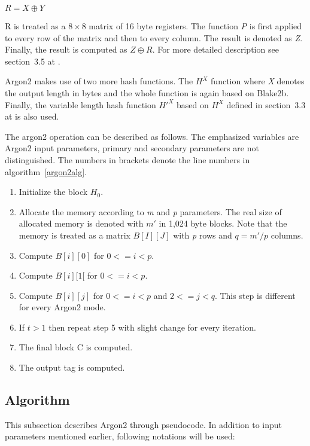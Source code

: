 \documentclass[nolof,digital]{fithesis3}
\begin{document}
\(R = X \oplus Y \)

R is treated as a \(8 \times 8 \) matrix of 16 byte registers. The function \emph{P} is first applied to every row of the matrix and then to every column. The result is denoted as \emph{Z}. Finally, the result is computed as \(Z \oplus R\). For more detailed description see section~3.5 at \parencite{argon2draft}.

Argon2 makes use of two more hash functions. The \emph{\(H^X\)} function where \emph{X} denotes the output length in bytes and the whole function is again based on Blake2b. Finally, the variable length hash function \emph{\(H'^X\)} based on \emph{\(H^X\)} defined in section~3.3 at \parencite{argon2draft} is also used.

The argon2 operation can be described as follows. The emphasized variables are Argon2 input parameters, primary and secondary parameters are not distinguished. The numbers in brackets denote the line numbers in algorithm~\ref{argon2alg}.

\begin{enumerate}
\item Initialize the block \(H_0\).

\item Allocate the memory according to \emph{m} and \emph{p} parameters. The real size of allocated memory is denoted with \(m'\) in 1,024 byte blocks. Note that the memory is treated as a matrix \(B[I][J]\) with \emph{p} rows and \(q = m' / p\) columns.

\item Compute \(B[i][0]\) for \(0 <= i < p\).

\item Compute \(B[i][1[\) for \(0 <= i < p\).

\item Compute \(B[i][j]\) for \(0 <= i < p\) and \(2 <= j < q\). This step is different for every Argon2 mode.

\item If \emph{\(t\)}\(> 1\) then repeat step 5 with slight change for every iteration.

\item The final block C is computed.

\item The output tag is computed.
\end{enumerate}

\subsection{Algorithm}
This subsection describes Argon2 through pseudocode. In addition to input parameters mentioned earlier, following notations will be used:
\end{document}
